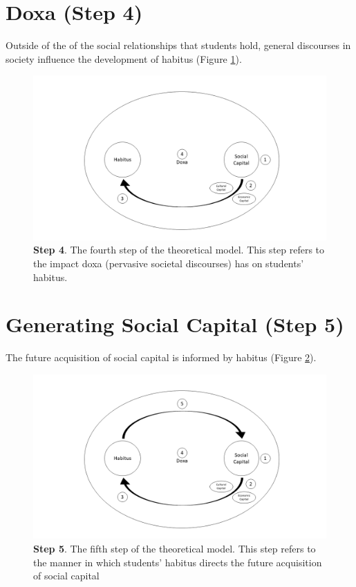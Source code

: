 \section{Doxa (Step 4)}
Outside of the of the social relationships that students hold, general discourses in society influence the development of habitus (Figure \ref{fig:TheoreticalModel4_C5}). 

\begin{figure}[ht]
\centering
\includegraphics[width=\textwidth]{C5 - Understanding Capital Accumulation/HabitusSocCap_TheoreticalModel4.png}
\caption{\label{fig:TheoreticalModel4_C5}\textbf{Step 4}. The fourth step of the theoretical model. This step refers to the impact doxa (pervasive societal discourses) has on students' habitus.}
\end{figure}

\section{Generating Social Capital (Step 5)}
The future acquisition of social capital is informed by habitus (Figure \ref{fig:TheoreticalModel5_C5}). 
\begin{figure}[ht]
\centering
\includegraphics[width=\textwidth]{C5 - Understanding Capital Accumulation/HabitusSocCap_TheoreticalModel5.png}
\caption{\label{fig:TheoreticalModel5_C5}\textbf{Step 5}. The fifth step of the theoretical model. This step refers to the manner in which students' habitus directs the future acquisition of social capital}
\end{figure}



